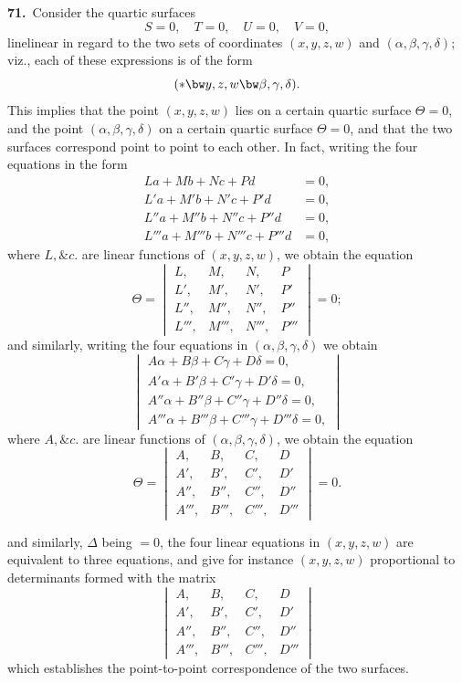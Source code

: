 \documentclass[11pt,a4paper]{article}
\begin{document}
\noindent\textbf{71.}\ Consider the quartic surfaces
\[
S = 0,\quad T = 0,\quad U = 0,\quad V = 0,
\]
linelinear in regard to the two sets of coordinates $(x, y, z, w)$ and $(\alpha, \beta, \gamma, \delta)$; viz., each of these expressions is of the form
\[
(\ast \bw y, z, w \bw\beta, \gamma, \delta).
\]
This implies that the point $(x, y, z, w)$ lies on a certain quartic surface $\Theta = 0$, and the point $(\alpha, \beta, \gamma, \delta)$ on a certain quartic surface $\Theta = 0$, and that the two surfaces correspond point to point to each other. In fact, writing the four equations in the form
\begin{align*}
La + Mb + Nc + Pd &= 0,\\
L'a + M'b + N'c + P'd &= 0,\\
L''a + M''b + N''c + P''d &= 0,\\
L'''a + M'''b + N'''c + P'''d &= 0,
\end{align*}
where $L, \&c.$ are linear functions of $(x, y, z, w)$, we obtain the equation
\[
\Theta = \begin{vmatrix}
L, & M, & N, & P\\
L', & M', & N', & P'\\
L'', & M'', & N'', & P''\\
L''', & M''', & N''', & P'''
\end{vmatrix} = 0;
\]
and similarly, writing the four equations in $(\alpha, \beta, \gamma, \delta)$ we obtain
\[
\begin{vmatrix}
A\alpha + B\beta + C\gamma + D\delta = 0,\\
A'\alpha + B'\beta + C'\gamma + D'\delta = 0,\\
A''\alpha + B''\beta + C''\gamma + D''\delta = 0,\\
A'''\alpha + B'''\beta + C'''\gamma + D'''\delta = 0,
\end{vmatrix}
\]
where $A, \&c.$ are linear functions of $(\alpha, \beta, \gamma, \delta)$, we obtain the equation
\[
\Theta = \begin{vmatrix}
A, & B, & C, & D\\
A', & B', & C', & D'\\
A'', & B'', & C'', & D''\\
A''', & B''', & C''', & D'''
\end{vmatrix} = 0.
\]

\newpage
\setcounter{page}{160}

\noindent and similarly, $\Delta$ being $= 0$, the four linear equations in $(x, y, z, w)$ are equivalent to three equations, and give for instance $(x, y, z, w)$ proportional to determinants formed with the matrix
\[
\begin{vmatrix}
A, & B, & C, & D\\
A', & B', & C', & D'\\
A'', & B'', & C'', & D''\\
A''', & B''', & C''', & D'''
\end{vmatrix}
\]
which establishes the point-to-point correspondence of the two surfaces.
\end{document}
